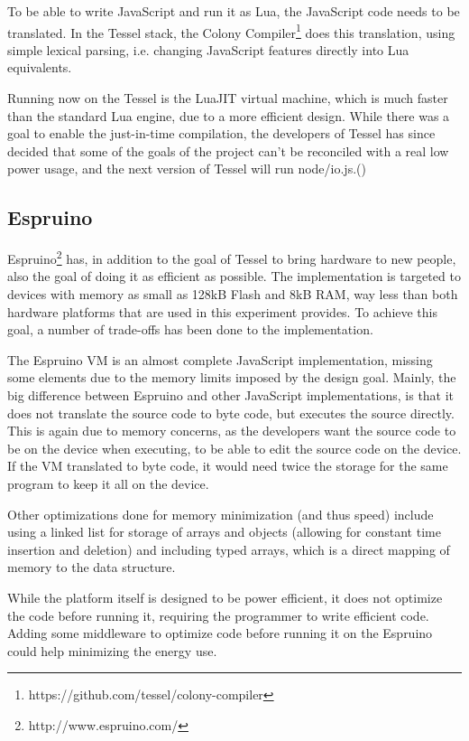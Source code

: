 To be able to write JavaScript and run it as Lua, the JavaScript code needs to be translated.
In the Tessel stack, the Colony Compiler\footnote{https://github.com/tessel/colony-compiler} does this translation, using simple lexical parsing, i.e. changing JavaScript features directly into Lua equivalents.

Running now on the Tessel is the LuaJIT virtual machine, which is much faster than the standard Lua engine, due to a more efficient design. While there was a goal to enable the just-in-time compilation, the developers of Tessel has since decided that some of the goals of the project can’t be reconciled with a real low power usage, and the next version of Tessel will run node/io.js.(\cite{movingfaster})

\subsection{Espruino}
Espruino\footnote{http://www.espruino.com/} has, in addition to the goal of Tessel to bring hardware to new people, also the goal of doing it as efficient as possible.
The implementation is targeted to devices with memory as small as 128kB Flash and 8kB RAM, way less than both hardware platforms that are used in this experiment provides.
To achieve this goal, a number of trade-offs has been done to the implementation.

The Espruino VM is an almost complete JavaScript implementation, missing some elements due to the memory limits imposed by the design goal. 
Mainly, the big difference between Espruino and other JavaScript implementations, is that it does not translate the source code to byte code, but executes the source directly. 
This is again due to memory concerns, as the developers want the source code to be on the device when executing, to be able to edit the source code on the device. 
If the VM translated to byte code, it would need twice the storage for the same program to keep it all on the device.

Other optimizations done for memory minimization (and thus speed) include using a linked list for storage of arrays and objects (allowing for constant time insertion and deletion) and including typed arrays, which is a direct mapping of memory to the data structure.

While the platform itself is designed to be power efficient, it does not optimize the code before running it, requiring the programmer to write efficient code. 
Adding some middleware to optimize code before running it on the Espruino could help minimizing the energy use.

